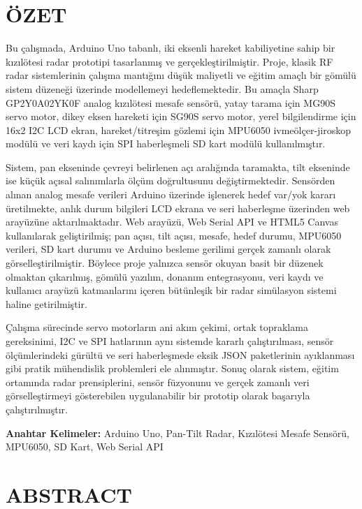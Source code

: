 ﻿
\section*{ÖZET}
\vspace{.5cm}

Bu çalışmada, Arduino Uno tabanlı, iki eksenli hareket kabiliyetine sahip bir kızılötesi radar prototipi tasarlanmış ve gerçekleştirilmiştir. Proje, klasik RF radar sistemlerinin çalışma mantığını düşük maliyetli ve eğitim amaçlı bir gömülü sistem düzeneği üzerinde modellemeyi hedeflemektedir. Bu amaçla Sharp GP2Y0A02YK0F analog kızılötesi mesafe sensörü, yatay tarama için MG90S servo motor, dikey eksen hareketi için SG90S servo motor, yerel bilgilendirme için 16x2 I2C LCD ekran, hareket/titreşim gözlemi için MPU6050 ivmeölçer-jiroskop modülü ve veri kaydı için SPI haberleşmeli SD kart modülü kullanılmıştır.

Sistem, pan ekseninde çevreyi belirlenen açı aralığında taramakta, tilt ekseninde ise küçük açısal salınımlarla ölçüm doğrultusunu değiştirmektedir. Sensörden alınan analog mesafe verileri Arduino üzerinde işlenerek hedef var/yok kararı üretilmekte, anlık durum bilgileri LCD ekrana ve seri haberleşme üzerinden web arayüzüne aktarılmaktadır. Web arayüzü, Web Serial API ve HTML5 Canvas kullanılarak geliştirilmiş; pan açısı, tilt açısı, mesafe, hedef durumu, MPU6050 verileri, SD kart durumu ve Arduino besleme gerilimi gerçek zamanlı olarak görselleştirilmiştir. Böylece proje yalnızca sensör okuyan basit bir düzenek olmaktan çıkarılmış, gömülü yazılım, donanım entegrasyonu, veri kaydı ve kullanıcı arayüzü katmanlarını içeren bütünleşik bir radar simülasyon sistemi haline getirilmiştir.

Çalışma sürecinde servo motorların ani akım çekimi, ortak topraklama gereksinimi, I2C ve SPI hatlarının aynı sistemde kararlı çalıştırılması, sensör ölçümlerindeki gürültü ve seri haberleşmede eksik JSON paketlerinin ayıklanması gibi pratik mühendislik problemleri ele alınmıştır. Sonuç olarak sistem, eğitim ortamında radar prensiplerini, sensör füzyonunu ve gerçek zamanlı veri görselleştirmeyi gösterebilen uygulanabilir bir prototip olarak başarıyla çalıştırılmıştır.

\vspace{1cm}
\textbf{Anahtar Kelimeler:} Arduino Uno, Pan-Tilt Radar, Kızılötesi Mesafe Sensörü, MPU6050, SD Kart, Web Serial API

\newpage
{}
\section*{ABSTRACT}
\vspace{.5cm}


